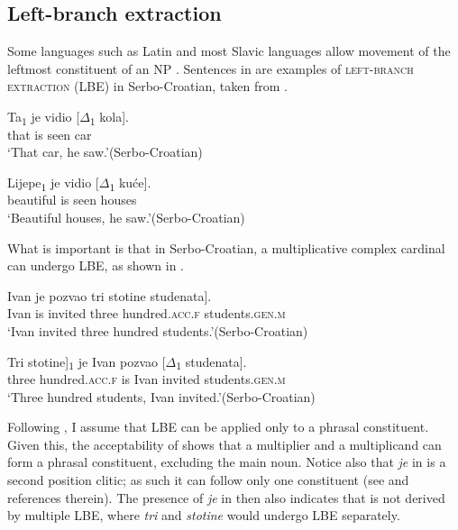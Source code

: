 \documentclass[output=paper]{langscibook}
\begin{document}
\subsection{Left-branch extraction}\label{tat:sec:lbe}
Some languages such as Latin and most Slavic languages allow movement of the leftmost constituent of an NP \citep{Ross1986}. Sentences in  are examples of \textsc{left-branch extraction} (LBE) in Serbo-Croatian, taken from \citet{Boskovic2005}.

\ea\label{tat:lbe}
\ea\label{tat:ex:lbea}
\gll Ta\textsubscript{$1$} je vidio [$\Delta$\textsubscript{$1$} kola].\\  
     that is seen {} car\\ 
\glt `That car, he saw.'\hfill (Serbo-Croatian)

\ex\label{tat:ex:lbeb}
\gll Lijepe\textsubscript{$1$} je vidio [$\Delta$\textsubscript{$1$} kuće].\\  
     beautiful is seen {} houses\\ 
\glt `Beautiful houses, he saw.'\hfill (Serbo-Croatian)
\z\z	

\noindent What is important is that in Serbo-Croatian, a multiplicative complex cardinal can undergo LBE, as shown in .

\ea
\ea
\gll Ivan je pozvao \minsp{[} {tri} {stotine} studenata].\\  
     Ivan is invited {} three hundred.\textsc{acc.f} students.\textsc{gen.m}\\ 
\glt `Ivan invited three hundred students.'\hfill (Serbo-Croatian)

\ex\label{tat:lbe2}
\gll \minsp{[} {Tri} {stotine}]\textsubscript{$1$} je Ivan pozvao [$\Delta$\textsubscript{$1$} studenata].\\  
     {} three hundred.\textsc{acc.f} is Ivan invited {} students.\textsc{gen.m}\\ 
\glt `Three hundred students, Ivan invited.'\hfill (Serbo-Croatian)
\z\z	

\noindent Following \citet{Corver1992}, I assume that LBE can be applied only to a phrasal constituent. Given this, the acceptability of  shows that a multiplier and a multiplicand can form a phrasal constituent, excluding the main noun. Notice also that \textit{je} in  is a second position clitic; as such it can follow only one constituent (see \citealt{Boskovic2001} and references therein). The presence of \textit{je} in  then also indicates that  is not derived by multiple LBE, where \textit{tri} and \textit{stotine} would undergo LBE separately.
\end{document}
